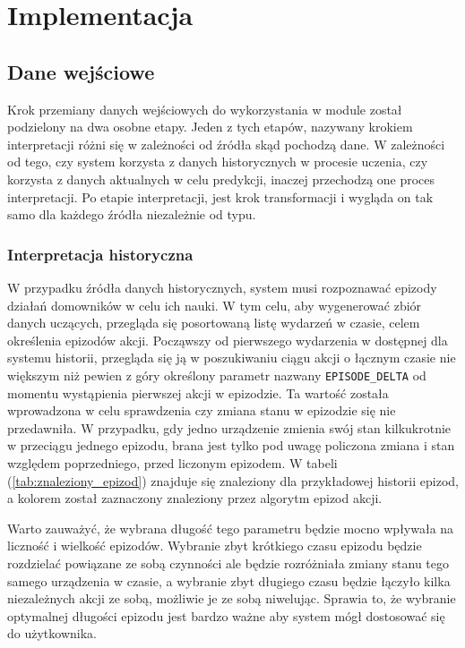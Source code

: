 \chapter{Implementacja}

\section{Dane wejściowe}
Krok przemiany danych wejściowych do wykorzystania w module został podzielony na dwa osobne etapy. Jeden z tych etapów, nazywany krokiem interpretacji różni się w zależności od źródła skąd pochodzą dane. W zależności od tego, czy system korzysta z danych historycznych w procesie uczenia, czy korzysta z danych aktualnych w celu predykcji, inaczej przechodzą one proces interpretacji. Po etapie interpretacji, jest krok transformacji i wygląda on tak samo dla każdego źródła niezależnie od typu.

\subsection{Interpretacja historyczna}
W przypadku źródła danych historycznych, system musi rozpoznawać epizody działań domowników w celu ich nauki. W tym celu, aby wygenerować zbiór danych uczących, przegląda się posortowaną listę wydarzeń w czasie, celem określenia epizodów akcji. Począwszy od pierwszego wydarzenia w dostępnej dla systemu historii, przegląda się ją w poszukiwaniu ciągu akcji o łącznym czasie nie większym niż pewien z góry określony parametr nazwany \verb+EPISODE_DELTA+ od momentu wystąpienia pierwszej akcji w epizodzie. Ta wartość została wprowadzona w celu sprawdzenia czy zmiana stanu w epizodzie się nie przedawniła. W przypadku, gdy jedno urządzenie zmienia swój stan kilkukrotnie w przeciągu jednego epizodu, brana jest tylko pod uwagę policzona zmiana i stan względem poprzedniego, przed liczonym epizodem. W tabeli (\ref{tab:znaleziony_epizod}) znajduje się znaleziony dla przykładowej historii epizod, a kolorem został zaznaczony znaleziony przez algorytm epizod akcji. 

Warto zauważyć, że wybrana długość tego parametru będzie mocno wpływała na liczność i wielkość epizodów. Wybranie zbyt krótkiego czasu epizodu będzie rozdzielać powiązane ze sobą czynności ale będzie rozróżniała zmiany stanu tego samego urządzenia w czasie, a wybranie zbyt długiego czasu będzie łączyło kilka niezależnych akcji ze sobą, możliwie je ze sobą niwelując. Sprawia to, że wybranie optymalnej długości epizodu jest bardzo ważne aby system mógł dostosować się do użytkownika.

